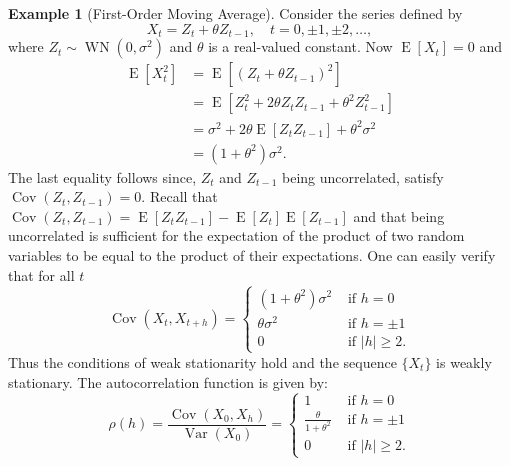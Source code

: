 \documentclass[11pt,a4]{article}
\DeclareMathOperator{\cov}{Cov}
\DeclareMathOperator{\E}{E}
\DeclareMathOperator{\var}{Var}
\DeclareMathOperator{\WN}{WN}
\theoremstyle{definition}
\newtheorem{example}{Example}
\begin{document}
\begin{example}[First-Order Moving Average]
Consider the series defined by
\begin{equation}
    X_t = Z_t + \theta Z_{t - 1}, \quad t = 0, \pm 1, \pm 2, \ldots,
\end{equation}
where $Z_t \sim \WN(0, \sigma^2)$ and $\theta$ is a real-valued constant. Now 
$\E [X_t] = 0$ and 
\begin{align*}
    \E [X_t^2] & = \E [ (Z_t + \theta Z_{t - 1})^2 ] \\
               & = \E [ Z_t^2 + 2 \theta Z_t Z_{t - 1} + \theta^2 Z_{t - 1}^2] \\
               & = \sigma^2 + 2 \theta \E [Z_t Z_{t - 1}] +  \theta^2 \sigma^2 \\
               & = (1 + \theta^2) \sigma^2.
\end{align*}
The last equality follows since, $Z_t$ and $Z_{t - 1}$ being uncorrelated, 
satisfy $\cov (Z_t, Z_{t - 1}) = 0$. Recall that 
$\cov (Z_t, Z_{t - 1}) = \E [Z_t Z_{t - 1}] - \E [Z_t] \E [Z_{t - 1}]$ 
and that being uncorrelated is sufficient for the expectation of the product 
of two random variables to be equal to the product of their expectations. One 
can easily verify that for all $t$
\begin{equation}
    \cov (X_t, X_{t + h}) = 
        \left \{ 
            \begin{array}{ll}
                (1 + \theta^2) \sigma^2 & \text{ if } h = 0 \\
                \theta \sigma^2         & \text{ if } h = \pm 1 \\
                0                       & \text{ if } |h| \geq 2.
            \end{array}        
        \right . 
\end{equation} 
Thus the conditions of weak stationarity hold and the sequence $\{ X_t \}$ 
is weakly stationary. The autocorrelation function is given by:
\begin{equation}
    \rho (h) = \frac{\cov (X_0, X_{h})}{\var(X_0)} = 
        \left \{ 
            \begin{array}{ll}
                1                             & \text{ if } h = 0 \\
                \frac{\theta}{1 + \theta^2}   & \text{ if } h = \pm 1 \\
                0                             & \text{ if } |h| \geq 2.
            \end{array}        
        \right . 
\end{equation} 
\end{example}
\end{document}
